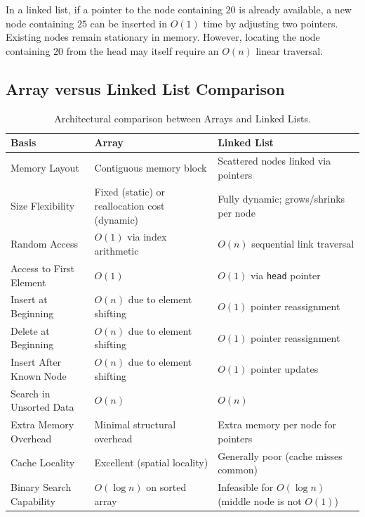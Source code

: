 In a linked list, if a pointer to the node containing $20$ is already available, a new node containing $25$ can be inserted in $O(1)$ time by adjusting two pointers. Existing nodes remain stationary in memory. However, locating the node containing $20$ from the head may itself require an $O(n)$ linear traversal.

\subsection{Array versus Linked List Comparison}

\begin{table}[htbp]
\centering
\footnotesize
\begin{tabularx}{\textwidth}{l X X}
\toprule
\textbf{Basis} & \textbf{Array} & \textbf{Linked List} \\
\midrule
Memory Layout                   & Contiguous memory block                           & Scattered nodes linked via pointers \\
Size Flexibility                & Fixed (static) or reallocation cost (dynamic)      & Fully dynamic; grows/shrinks per node \\
Random Access                   & $O(1)$ via index arithmetic                       & $O(n)$ sequential link traversal \\
Access to First Element         & $O(1)$                                            & $O(1)$ via \texttt{head} pointer \\
Insert at Beginning             & $O(n)$ due to element shifting                    & $O(1)$ pointer reassignment \\
Delete at Beginning             & $O(n)$ due to element shifting                    & $O(1)$ pointer reassignment \\
Insert After Known Node         & $O(n)$ due to element shifting                    & $O(1)$ pointer updates \\
Search in Unsorted Data         & $O(n)$                                            & $O(n)$ \\
Extra Memory Overhead           & Minimal structural overhead                       & Extra memory per node for pointers \\
Cache Locality                  & Excellent (spatial locality)                      & Generally poor (cache misses common) \\
Binary Search Capability        & $O(\log n)$ on sorted array                       & Infeasible for $O(\log n)$ (middle node is not $O(1)$) \\
\bottomrule
\end{tabularx}
\caption{Architectural comparison between Arrays and Linked Lists.}
\end{table}

